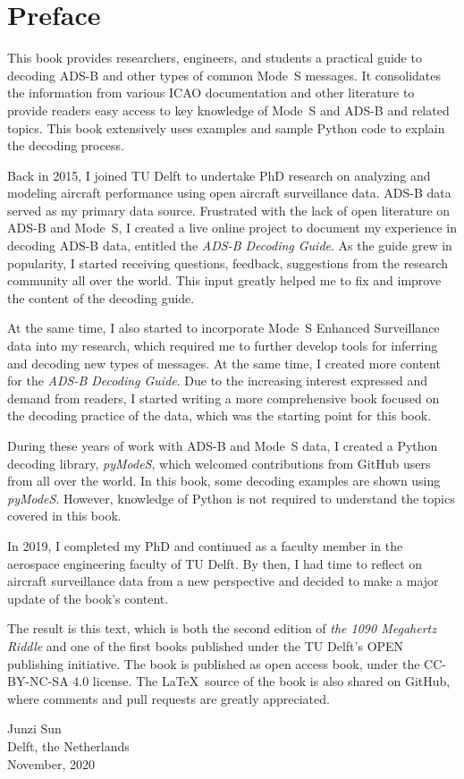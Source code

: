\chapter*{Preface}

\vspace{-0.3cm}

{
This book provides researchers, engineers, and students a practical guide to decoding ADS-B and other types of common Mode~S messages. It consolidates the information from various ICAO documentation and other literature to provide readers easy access to key knowledge of Mode~S and ADS-B and related topics. This book extensively uses examples and sample Python code to explain the decoding process.

Back in 2015, I joined TU Delft to undertake PhD research on analyzing and modeling aircraft performance using open aircraft surveillance data. ADS-B data served as my primary data source. Frustrated with the lack of open literature on ADS-B and Mode~S, I created a live online project to document my experience in decoding ADS-B data, entitled the \emph{ADS-B Decoding Guide}. As the guide grew in popularity, I started receiving questions, feedback, suggestions from the research community all over the world. This input greatly helped me to fix and improve the content of the decoding guide.

At the same time, I also started to incorporate Mode~S Enhanced Surveillance data into my research, which required me to further develop tools for inferring and decoding new types of messages. At the same time, I created more content for the \emph{ADS-B Decoding Guide}. Due to the increasing interest expressed and demand from readers, I started writing a more comprehensive book focused on the decoding practice of the data, which was the starting point for this book.

During these years of work with ADS-B and Mode~S data, I created a Python decoding library, \emph{pyModeS}, which welcomed contributions from GitHub users from all over the world. In this book, some decoding examples are shown using \emph{pyModeS}. However, knowledge of Python is not required to understand the topics covered in this book.

In 2019, I completed my PhD and continued as a faculty member in the aerospace engineering faculty of TU Delft. By then, I had time to reflect on aircraft surveillance data from a new perspective and decided to make a major update of the book's content.

The result is this text, which is both the second edition of \emph{the 1090 Megahertz Riddle} and one of the first books published under the TU Delft's OPEN publishing initiative. The book is published as open access book, under the CC-BY-NC-SA 4.0 license. The \LaTeX~source of the book is also shared on GitHub, where comments and pull requests are greatly appreciated.

\vspace{0.4cm}

\begin{flushright}
  Junzi Sun \\
  Delft, the Netherlands \\
  November, 2020
\end{flushright}
}
